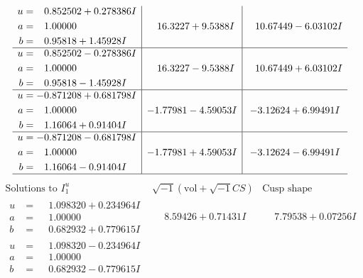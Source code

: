 \documentclass[1p]{elsarticle_modified}
\theoremstyle{definition}
\newcommand{\I}{\sqrt{-1}}
\begin{document}
$$\begin{array}{c|c|c}
\begin{aligned}
u &= \phantom{-}0.852502 + 0.278386 I \\
a &= \phantom{-}1.00000\phantom{ +0.000000I} \\
b &= \phantom{-}0.95818 + 1.45928 I\end{aligned}
 & \phantom{-}16.3227 + 9.5388 I & \phantom{-}10.67449 - 6.03102 I \\ \hline\begin{aligned}
u &= \phantom{-}0.852502 - 0.278386 I \\
a &= \phantom{-}1.00000\phantom{ +0.000000I} \\
b &= \phantom{-}0.95818 - 1.45928 I\end{aligned}
 & \phantom{-}16.3227 - 9.5388 I & \phantom{-}10.67449 + 6.03102 I \\ \hline\begin{aligned}
u &= -0.871208 + 0.681798 I \\
a &= \phantom{-}1.00000\phantom{ +0.000000I} \\
b &= \phantom{-}1.16064 + 0.91404 I\end{aligned}
 & -1.77981 - 4.59053 I & -3.12624 + 6.99491 I \\ \hline\begin{aligned}
u &= -0.871208 - 0.681798 I \\
a &= \phantom{-}1.00000\phantom{ +0.000000I} \\
b &= \phantom{-}1.16064 - 0.91404 I\end{aligned}
 & -1.77981 + 4.59053 I & -3.12624 - 6.99491 I\\
 \hline 
 \end{array}$$\newpage$$\begin{array}{c|c|c}  
\text{Solutions to }I^u_{1}& \I (\text{vol} + \sqrt{-1}CS) & \text{Cusp shape}\\
 \hline 
\begin{aligned}
u &= \phantom{-}1.098320 + 0.234964 I \\
a &= \phantom{-}1.00000\phantom{ +0.000000I} \\
b &= \phantom{-}0.682932 + 0.779615 I\end{aligned}
 & \phantom{-}8.59426 + 0.71431 I & \phantom{-}7.79538 + 0.07256 I \\ \hline\begin{aligned}
u &= \phantom{-}1.098320 - 0.234964 I \\
a &= \phantom{-}1.00000\phantom{ +0.000000I} \\
b &= \phantom{-}0.682932 - 0.779615 I\end{aligned}

\end{array}$$
\end{document}
